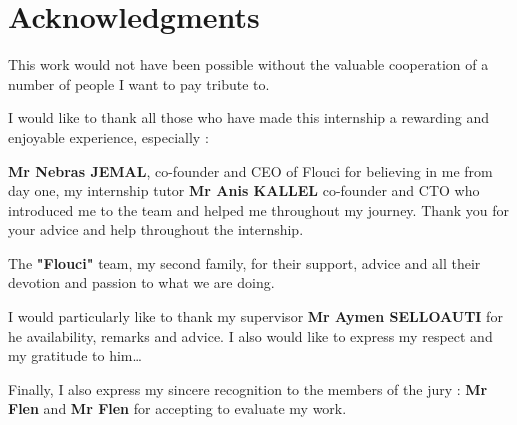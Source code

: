 \chapter*{Acknowledgments}

This work would not have been possible without the valuable cooperation of a number of people I want to pay tribute to.\newline

I would like to thank all those who have made this internship a rewarding and enjoyable experience, especially :\newline

\textbf{Mr Nebras JEMAL}, co-founder and CEO of Flouci for believing in me from day one, my internship tutor \textbf{Mr Anis KALLEL} co-founder and CTO who introduced me to the team and helped me throughout my journey. Thank you for your advice and help throughout the internship. \newline

The \textbf{"Flouci"} team, my second family, for their support, advice and all their devotion and passion to what we are doing.\newline

I would particularly like to thank my supervisor \textbf{Mr Aymen SELLOAUTI} for he availability, remarks and advice. I also would like to express my respect and my gratitude to him\dots\newline

Finally, I also express my sincere recognition to the members of the jury : \textbf{Mr Flen} and \textbf{Mr Flen} for accepting to evaluate my work.
